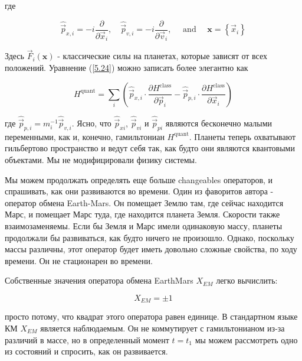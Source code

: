 \documentclass[main.tex]{subfiles}
\begin{document}
где

\begin{equation}\label{5.25}
	\hat{\vec{p}}_{x, i}=-i \frac{\partial}{\partial \vec{x}_{i}}, \quad \hat{\vec{p}}_{v, i}=-i \frac{\partial}{\partial \vec{v}_{i}}, \quad \text { and } \quad \mathbf{x}=\left\{\vec{x}_{i}\right\}
\end{equation}

Здесь $\vec F_i(\mathbf{x})$ - классические силы на планетах, которые зависят от всех положений. Уравнение (\ref{5.24}) можно записать более элегантно как


\begin{equation}\label{5.26}
	H^{\mathrm{quant}}=\sum_{i}\left(\hat{\vec{p}}_{x, i} \cdot \frac{\partial H^{\mathrm{class}}}{\partial \vec{p}_{i}}-\hat{\vec{p}}_{p, i} \cdot \frac{\partial H^{\mathrm{class}}}{\partial \vec{x}_{i}}\right)
\end{equation}

где $\hat{\vec{p}}_{p,i} = m_i^{-1} \hat{\vec{p}}_{v,i}$. Ясно, что $\hat{\vec{p}}_{xi}$, $\hat{\vec{p}}_{vi}$ и $\hat{\vec{p}}_{pi}$ являются бесконечно малыми переменными, как и, конечно, гамильтониан $H^{\mathrm{quant}}$. Планеты теперь охватывают гильбертово пространство и ведут себя так, как будто они являются квантовыми объектами. Мы не модифицировали физику системы.

Мы можем продолжать определять еще больше changeables операторов, и спрашивать, как они развиваются во времени. Один из фаворитов автора - оператор обмена Earth-Mars. Он помещает Землю там, где сейчас находится Марс, и помещает Марс туда, где находится планета Земля. Скорости также взаимозаменяемы. Если бы Земля и Марс имели одинаковую массу, планеты продолжали бы развиваться, как будто ничего не произошло. Однако, поскольку массы различны, этот оператор будет иметь довольно сложные свойства, по ходу времени. Он не стационарен во времени.

Собственные значения оператора обмена EarthMars $X_{EM}$ легко вычислить:

\begin{equation}\label{5.27}
	X_{EM} = \pm1
\end{equation}

просто потому, что квадрат этого оператора равен единице. В стандартном языке КМ $X_{EM}$ является наблюдаемым. Он не коммутирует с гамильтонианом из-за различий в массе, но в определенный момент $t = t_1$ мы можем рассмотреть одно из состояний и спросить, как он развивается.
\end{document}
